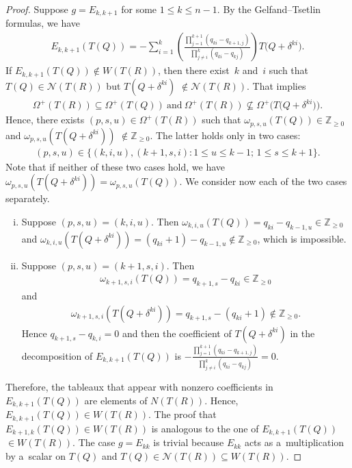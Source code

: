 \begin{proof}
Suppose $g=E_{k,k+1}$ for some $1\leq k\leq n-1$.
By the Gelfand--Tsetlin formulas, we have
\begin{gather*}
E_{k,k+1}(T(Q))=-\sum\limits_{i=1}^{k}\left(\frac{\prod\limits_{j=1}^{k+1}(q_{ki}-q_{k+1,j})}{\prod\limits_{j\neq
i}^{k}(q_{ki}-q_{kj})}\right)T\big(Q+\delta^{ki}\big).
\end{gather*}
If $E_{k,k+1}(T(Q))\notin W(T(R))$, then there exist~$k$ and~$i$ such that $T(Q)\in \mathcal{N}(T(R))$ but
$T(Q+\delta^{ki})$ $\notin\mathcal{N}(T(R))$.
That implies
\begin{gather*}
\Omega^{+}(T(R))\subseteq\Omega^{+}(T(Q))~\text{and}~\Omega^{+}(T(R))\nsubseteq\Omega^{+}\big(T\big(Q+\delta^{ki}\big)\big).
\end{gather*}
Hence, there exists $(p,s,u)\in\Omega^{+}(T(R))$ such that $\omega_{p,s,u}(T(Q))\in\mathbb{Z}_{\geq 0}$ and
$\omega_{p,s,u}(T(Q+\delta^{ki}))$ $\notin\mathbb{Z}_{\geq 0}$.
The latter holds only in two cases:
\begin{gather*}
(p,s,u)\in \{(k,i,u), (k+1,s,i): 1\leq u\leq k-1; \, 1\leq s\leq k+1\}.
\end{gather*}
Note that if neither of these two cases hold, we have $\omega_{p,s,u}(T(Q+\delta^{ki}))=\omega_{p,s,u}(T(Q))$.
We consider now each of the two cases separately.
\begin{enumerate}[(i)]\itemsep=0pt
\item Suppose $(p,s,u)=(k,i,u)$.
Then $\omega_{k,i,u}(T(Q))=q_{ki}-q_{k-1,u}\in\mathbb{Z}_{\geq 0}$ and
$\omega_{k,i,u}(T(Q+\delta^{ki}))=(q_{ki}+1)-q_{k-1,u}\notin \mathbb{Z}_{\geq 0}$, which is impossible.
\item Suppose $(p,s,u)=(k+1,s,i)$.
Then
\begin{gather*}
\omega_{k+1,s,i}(T(Q))=q_{k+1,s}-q_{ki}\in\mathbb{Z}_{\geq 0}
\end{gather*}
{and}
\begin{gather*}
\omega_{k+1,s,i}(T(Q+\delta^{ki}))=q_{k+1,s}-(q_{ki}+1)\notin \mathbb{Z}_{\geq 0}.
\end{gather*}
Hence $q_{k+1,s}-q_{k,i}=0$ and then the coef\/f\/icient of $T(Q+\delta^{ki})$ in the decomposition of $E_{k,k+1}(T(Q))$ is
$-\frac{\prod\limits_{j=1}^{k+1}(q_{ki}-q_{k+1,j})}{\prod\limits_{j\neq i}^{k}(q_{ki}-q_{kj})}=0$.
\end{enumerate}
Therefore, the tableaux that appear with nonzero coef\/f\/icients in $E_{k,k+1}(T(Q))$ are elements of $N(T(R))$.
Hence, $E_{k,k+1}(T(Q))\in W(T(R))$.
The proof that $E_{k+1,k}(T(Q))\in W(T(R))$ is analogous to the one of $E_{k,k+1}(T(Q))$ $\in W(T(R))$.
The case $g=E_{kk}$ is trivial because $E_{kk}$ acts as a~multiplication by a~scalar on $T(Q)$ and
$T(Q)\in\mathcal{N}(T(R))\subseteq W(T(R))$.
\end{proof}

